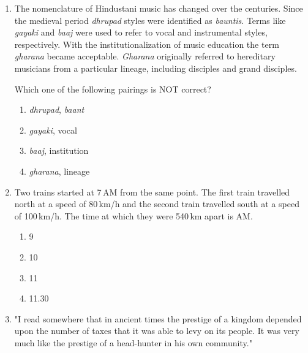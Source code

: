 \documentclass[journal,12pt,onecolumn]{IEEEtran}
\begin{document}
\begin{enumerate}[itemsep=0.5cm]
\vspace{1em}

\item The nomenclature of Hindustani music has changed over the centuries. Since the medieval period \textit{dhrupad} styles were identified as \textit{bauntis}. Terms like \textit{gayaki} and \textit{baaj} were used to refer to vocal and instrumental styles, respectively. With the institutionalization of music education the term \textit{gharana} became acceptable. \textit{Gharana} originally referred to hereditary musicians from a particular lineage, including disciples and grand disciples.

Which one of the following pairings is NOT correct?

\hfill{}


\begin{enumerate}
    \item \textit{dhrupad}, \textit{baant}
    \item \textit{gayaki}, vocal
    \item \textit{baaj}, institution
    \item \textit{gharana}, lineage
\end{enumerate}

\vspace{1em}

\item Two trains started at 7\,AM from the same point. The first train travelled north at a speed of 80\,km/h and the second train travelled south at a speed of 100\,km/h. The time at which they were 540\,km apart is AM.

\hfill{}

\begin{multicols}{4}
\begin{enumerate}
    \item 9
    \item 10
    \item 11
    \item 11.30
\end{enumerate}
\end{multicols}


\item "I read somewhere that in ancient times the prestige of a kingdom depended upon the number of taxes that it was able to levy on its people. It was very much like the prestige of a head-hunter in his own community."

\vspace{2em}


\end{enumerate}
\end{document}
